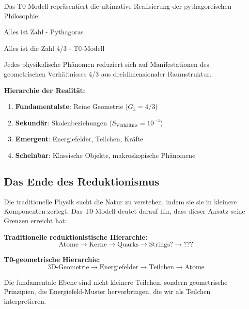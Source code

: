\documentclass[12pt,a4paper]{report}
\begin{document}
	Das T0-Modell repräsentiert die ultimative Realisierung der pythagoreischen Philosophie:
	
	\begin{tcolorbox}[colback=blue!5!white,colframe=blue!75!black,title=Realisierte pythagoreische Einsicht]
		Alles ist Zahl - Pythagoras
		
		Alles ist die Zahl 4/3 - T0-Modell
		
		Jedes physikalische Phänomen reduziert sich auf Manifestationen des geometrischen Verhältnisses 4/3 aus dreidimensionaler Raumstruktur.
	\end{tcolorbox}
	
	\textbf{Hierarchie der Realität:}
	\begin{enumerate}
		\item \textbf{Fundamentalste}: Reine Geometrie ($G_3 = 4/3$)
		\item \textbf{Sekundär}: Skalenbeziehungen ($S_{\text{Verhältnis}} = 10^{-4}$)
		\item \textbf{Emergent}: Energiefelder, Teilchen, Kräfte
		\item \textbf{Scheinbar}: Klassische Objekte, makroskopische Phänomene
	\end{enumerate}
	
	\subsection{Das Ende des Reduktionismus}
	\label{subsec:end_reductionism}
	
	Die traditionelle Physik sucht die Natur zu verstehen, indem sie sie in kleinere Komponenten zerlegt. Das T0-Modell deutet darauf hin, dass dieser Ansatz seine Grenzen erreicht hat:
	
	\textbf{Traditionelle reduktionistische Hierarchie:}
	\begin{equation}
		\text{Atome} \rightarrow \text{Kerne} \rightarrow \text{Quarks} \rightarrow \text{Strings?} \rightarrow \text{???}
	\end{equation}
	
	\textbf{T0-geometrische Hierarchie:}
	\begin{equation}
		\text{3D-Geometrie} \rightarrow \text{Energiefelder} \rightarrow \text{Teilchen} \rightarrow \text{Atome}
	\end{equation}
	
	Die fundamentale Ebene sind nicht kleinere Teilchen, sondern geometrische Prinzipien, die Energiefeld-Muster hervorbringen, die wir als Teilchen interpretieren.
	
\end{document}

